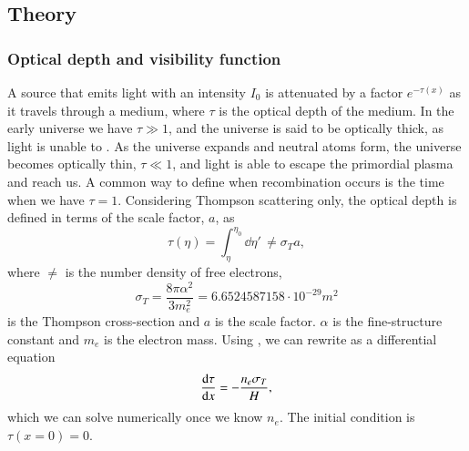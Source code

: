 

\subsection{Theory}\label{ssec:M2:theory}

\subsubsection{Optical depth and visibility function} \label{sssec:M2:optical_depth_and_visibility_function}

A source that emits light with an intensity $I_0$ is attenuated by a factor $e^{-\tau(x)}$ as it travels through a medium, where $\tau$ is the optical depth of the medium. In the early universe we have $\tau\gg1$, and the universe is said to be optically thick, as light is unable to . As the universe expands and neutral atoms form, the universe becomes optically thin, $\tau\ll1$, and light is able to escape the primordial plasma and reach us. A common way to define when recombination occurs is the time when we have $\tau=1$. Considering Thompson scattering only, the optical depth is defined in terms of the scale factor, $a$, as \cite[Eq. (5)]{callin} 
\begin{equation} \label{eq:M2:theory:optical_depth_integral_definition}
    \tau(\eta) = \int_\eta^{\eta_0} \dd \eta' \,\ne \sigma_T a,
\end{equation}
where $\ne$ is the number density of free electrons,
\begin{equation} \label{eq:M2:theory:thomspon_cross_section}
    \sigma_T=\frac{8\pi\alpha^2}{3 m_e^2} = 6.6524587158\cdot 10^{-29}\unit{m^2} 
\end{equation}
is the Thompson cross-section and $a$ is the scale factor. $\alpha$ is the fine-structure constant and $m_e$ is the electron mass. Using , we can rewrite  as a differential equation 
\begin{equation} \label{eq:M2:theory:tau_ODE}
    \dv{\tau}{x} = - \frac{n_e \sigma_T}{H},
\end{equation}
which we can solve numerically once we know $n_e$. The initial condition is $\tau(x=0)=0$.

